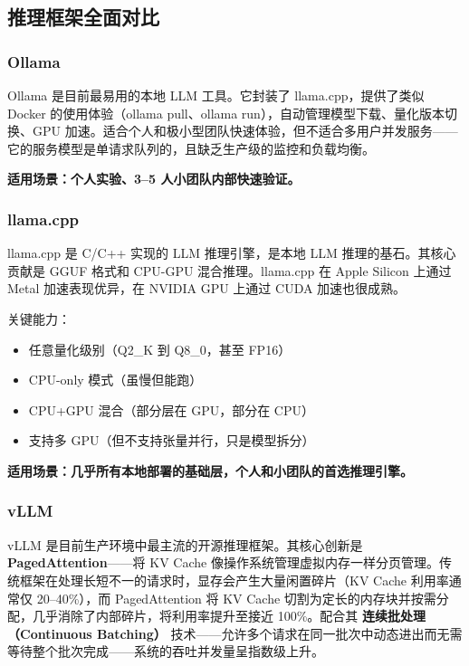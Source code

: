 \documentclass[UTF8,a4paper,10pt,oneside]{ctexart}
\begin{document}
\subsection{推理框架全面对比}

\subsubsection{Ollama}

Ollama 是目前最易用的本地 LLM 工具。它封装了 llama.cpp，提供了类似 Docker 的使用体验（ollama pull、ollama run），自动管理模型下载、量化版本切换、GPU 加速。适合个人和极小型团队快速体验，但不适合多用户并发服务——它的服务模型是单请求队列的，且缺乏生产级的监控和负载均衡。

\textbf{适用场景：个人实验、3--5 人小团队内部快速验证。}

\subsubsection{llama.cpp}

llama.cpp 是 C/C++ 实现的 LLM 推理引擎，是本地 LLM 推理的基石。其核心贡献是 GGUF 格式和 CPU-GPU 混合推理。llama.cpp 在 Apple Silicon 上通过 Metal 加速表现优异，在 NVIDIA GPU 上通过 CUDA 加速也很成熟。

关键能力：
\begin{itemize}
    \item 任意量化级别（Q2\_K 到 Q8\_0，甚至 FP16）
    \item CPU-only 模式（虽慢但能跑）
    \item CPU+GPU 混合（部分层在 GPU，部分在 CPU）
    \item 支持多 GPU（但不支持张量并行，只是模型拆分）
\end{itemize}

\textbf{适用场景：几乎所有本地部署的基础层，个人和小团队的首选推理引擎。}

\subsubsection{vLLM}

vLLM 是目前生产环境中最主流的开源推理框架。其核心创新是 \textbf{PagedAttention}——将 KV Cache 像操作系统管理虚拟内存一样分页管理。传统框架在处理长短不一的请求时，显存会产生大量闲置碎片（KV Cache 利用率通常仅 20--40\%），而 PagedAttention 将 KV Cache 切割为定长的内存块并按需分配，几乎消除了内部碎片，将利用率提升至接近 100\%。配合其 \textbf{连续批处理（Continuous Batching）} 技术——允许多个请求在同一批次中动态进出而无需等待整个批次完成——系统的吞吐并发量呈指数级上升。
\end{document}

